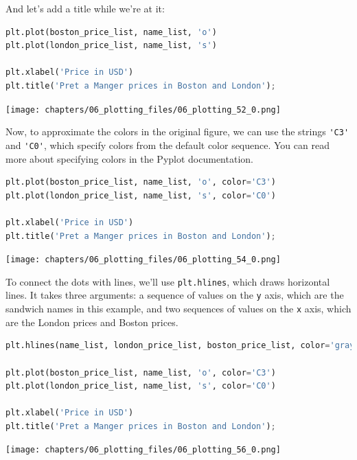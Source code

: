 And let's add a title while we're at it:

\begin{lstlisting}[language=Python,style=source]
plt.plot(boston_price_list, name_list, 'o')
plt.plot(london_price_list, name_list, 's')

plt.xlabel('Price in USD')
plt.title('Pret a Manger prices in Boston and London');
\end{lstlisting}

\begin{center}
\texttt{[image: chapters/06\_plotting\_files/06\_plotting\_52\_0.png]}
\end{center}

Now, to approximate the colors in the original figure, we can use the
strings \passthrough{\lstinline!'C3'!} and
\passthrough{\lstinline!'C0'!}, which specify colors from the default
color sequence. You can read more about specifying colors in the Pyplot
documentation.

\begin{lstlisting}[language=Python,style=source]
plt.plot(boston_price_list, name_list, 'o', color='C3')
plt.plot(london_price_list, name_list, 's', color='C0')

plt.xlabel('Price in USD')
plt.title('Pret a Manger prices in Boston and London');
\end{lstlisting}

\begin{center}
\texttt{[image: chapters/06\_plotting\_files/06\_plotting\_54\_0.png]}
\end{center}

To connect the dots with lines, we'll use
\passthrough{\lstinline!plt.hlines!}, which draws horizontal lines. It
takes three arguments: a sequence of values on the
\passthrough{\lstinline!y!} axis, which are the sandwich names in this
example, and two sequences of values on the \passthrough{\lstinline!x!}
axis, which are the London prices and Boston prices.

\begin{lstlisting}[language=Python,style=source]
plt.hlines(name_list, london_price_list, boston_price_list, color='gray')

plt.plot(boston_price_list, name_list, 'o', color='C3')
plt.plot(london_price_list, name_list, 's', color='C0')

plt.xlabel('Price in USD')
plt.title('Pret a Manger prices in Boston and London');
\end{lstlisting}

\begin{center}
\texttt{[image: chapters/06\_plotting\_files/06\_plotting\_56\_0.png]}
\end{center}

